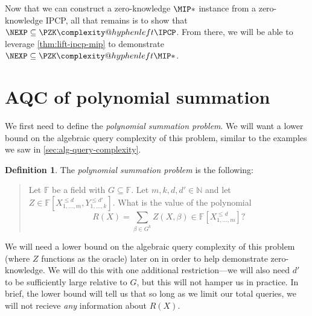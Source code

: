 \documentclass[english,12pt]{reedthesis}
\makeatletter
\theoremstyle{plain}
\theoremstyle{definition}
\newtheorem{defn}[defn]{Definition}
\theoremstyle{remark}
\newcommand{\PZKIPCP}{%
  \PZK\complexity@hyphenleft\IPCP
}
\newcommand{\PZKMIP}{%
  \PZK\complexity@hyphenleft\MIP
}
\makeatother
\begin{document}
Now that we can construct a zero-knowledge $\MIP*$ instance from a
zero-knowledge IPCP, all that remains is to show that $\NEXP \subseteq \PZKIPCP$. From
there, we will be able to leverage \cref{thm:lift-ipcp-mip} to demonstrate
$\NEXP \subseteq \PZKMIP*$.

\section{AQC of polynomial summation}\label{sec:aqc-poly-sum}

We first need to define the \emph{polynomial summation problem}. We will want a
lower bound on the algebraic query complexity of this problem, similar to the
examples we saw in \cref{sec:alg-query-complexity}.

\begin{defn}\label{def:poly-sum}
  The \emph{polynomial summation problem} is the following:
  \begin{quote}
    Let $\mathbb{F}$ be a field with $G \subseteq \mathbb{F}$. Let $m, k, d, d' \in \mathbb{N}$ and
    let $Z \in \mathbb{F}[X_{1, \ldots, m}^{\le d}, Y_{1, \ldots, k}^{\le d'}]$.
    What is the value of the polynomial
    \[
      R(X) = \sum_{\beta \in G^{k}}Z(X, \beta) \in \mathbb{F}[X_{1, \ldots, m}^{\le d}]?
    \]
  \end{quote}
\end{defn}

We will need a lower bound on the algebraic query complexity of this problem
(where $Z$ functions as the oracle) later on in order to help demonstrate
zero-knowledge. We will do this with one additional restriction---we will also
need $d'$ to be sufficiently large relative to $G$, but this will not hamper us
in practice. In brief, the lower bound will tell us that so long as we limit
our total queries, we will not recieve \emph{any} information about $R(X)$.

\end{document}
